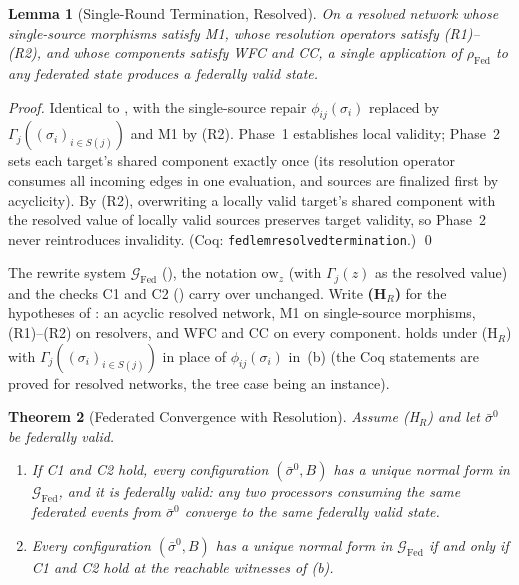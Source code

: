 \documentclass[11pt,a4paper]{article}
\theoremstyle{plain}
\newtheorem{theorem}{Theorem}[section]
\newtheorem{lemma}[theorem]{Lemma}
\theoremstyle{definition}
\theoremstyle{remark}
\newcommand{\Fed}{\mathrm{Fed}}
\renewcommand{\_}{\textunderscore\allowbreak}
\begin{document}
\begin{lemma}[Single-Round Termination, Resolved]
\label{lem:resolved-termination}
On a resolved network whose single-source morphisms satisfy M1, whose
resolution operators satisfy (R1)--(R2), and whose components satisfy WFC and
CC, a single application of $\rho_\Fed$ to any federated state produces a
federally valid state.
\end{lemma}

\begin{proof}
Identical to , with the single-source repair
$\phi_{ij}(\sigma_i)$ replaced by $\Gamma_j((\sigma_i)_{i \in S(j)})$ and M1 by (R2).
Phase~1 establishes local validity; Phase~2 sets each target's shared component
exactly once (its resolution operator consumes all incoming edges in one
evaluation, and sources are finalized first by acyclicity).  By (R2),
overwriting a locally valid target's shared component with the resolved value of
locally valid sources preserves target validity, so Phase~2 never reintroduces
invalidity.  (Coq: \texttt{fed\_lem\_resolved\_termination}.) \qed
\end{proof}

The rewrite system $\mathcal{G}_\Fed$ (), the notation
$\mathrm{ow}_z$ (with $\Gamma_j(z)$ as the resolved value) and the checks C1 and
C2 () carry over unchanged.  Write \textbf{(H$_R$)} for the
hypotheses of : an acyclic resolved network,
M1 on single-source morphisms, (R1)--(R2) on resolvers, and WFC and CC on every
component.   holds under (H$_R$) with
$\Gamma_j((\sigma_i)_{i \in S(j)})$ in place of $\phi_{ij}(\sigma_i)$ in~(b)
(the Coq statements are proved for resolved networks, the tree case being an
instance).

\begin{theorem}[Federated Convergence with Resolution]
\label{thm:resolved-convergence}
Assume (H$_R$) and let $\bar{\sigma}^0$ be federally valid.
\begin{enumerate}[leftmargin=*,nosep,label=(\alph*)]
\item If C1 and C2 hold, every configuration $(\bar{\sigma}^0, B)$ has a unique
  normal form in $\mathcal{G}_\Fed$, and it is federally valid: any two
  processors consuming the same federated events from $\bar{\sigma}^0$ converge
  to the same federally valid state.
\item Every configuration $(\bar{\sigma}^0, B)$ has a unique normal form in
  $\mathcal{G}_\Fed$ if and only if C1 and C2 hold at the reachable witnesses
  of (b).
\end{enumerate}
\end{theorem}
\end{document}
